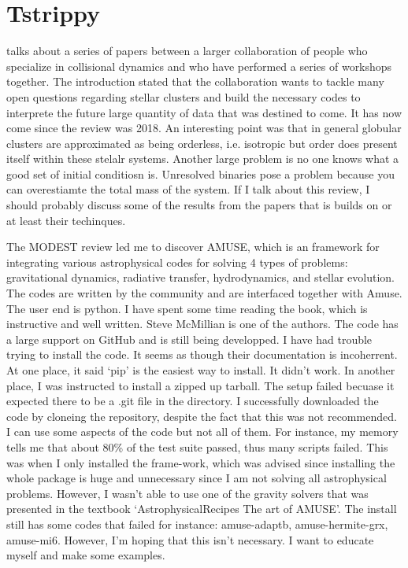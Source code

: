 \section{Tstrippy}

    \citet{2018ComAC...5....2V} talks about a series of papers between a larger collaboration of people who specialize in collisional dynamics and who have performed a series of workshops together. The introduction stated that the collaboration wants to tackle many open questions regarding stellar clusters and build the necessary codes to interprete the future large quantity of data that was destined to come. It has now come since the review was 2018. An interesting point was that in general globular clusters are approximated as being orderless, i.e. isotropic but order does present itself within these stelalr systems. Another large problem is no one knows what a good set of initial conditiosn is. Unresolved binaries pose a problem because you can overestiamte the total mass of the system. If I talk about this review, I should probably discuss some of the results from the papers that is builds on or at least their techinques.

    The MODEST review led me to discover AMUSE, which is an framework for integrating various astrophysical codes for solving 4 types of problems: gravitational dynamics, radiative transfer, hydrodynamics, and stellar evolution. The codes are written by the community and are interfaced together with Amuse. The user end is python. I have spent some time reading the book, which is instructive and well written. Steve McMillian is one of the authors. The code has a large support on GitHub and is still being developped. I have had trouble trying to install the code. It seems as though their documentation is incoherrent. At one place, it said `pip' is the easiest way to install. It didn't work. In another place, I was instructed to install a zipped up tarball. The setup failed becuase it expected there to be a .git file in the directory. I successfully downloaded the code by cloneing the repository, despite the fact that this was not recommended. I can use some aspects of the code but not all of them. For instance, my memory tells me that about 80\% of the test suite passed, thus many scripts failed. This was when I only installed the frame-work, which was advised since installing the whole package is huge and unnecessary since I am not solving all astrophysical problems. However, I wasn't able to use one of the gravity solvers that was presented in the textbook `AstrophysicalRecipes The art of AMUSE'. The install still has some codes that failed for instance: amuse-adaptb, amuse-hermite-grx, amuse-mi6. However, I'm hoping that this isn't necessary. I want to educate myself and make some examples. 

